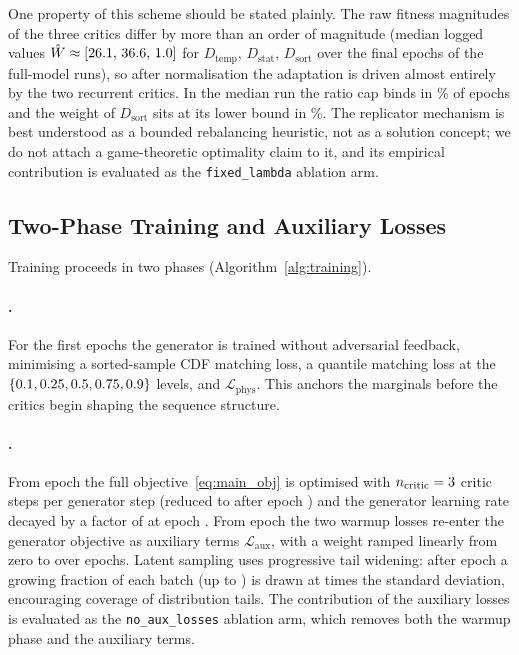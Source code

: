 \documentclass[preprint,12pt]{elsarticle}
\makeatletter
\let\ElsParagraph\paragraph
\def\StripRunInStop#1.\StripRunInMark#2\StripRunInEnd{#1}
\let\StripRunInMark\@empty
\renewcommand\paragraph[1]{\ElsParagraph{\StripRunInStop#1\StripRunInMark.\StripRunInMark\StripRunInEnd}}
\newcommand{\Lc}{\mathcal{L}}
\newcommand{\Dtemp}{D_{\mathrm{temp}}}
\newcommand{\Dstat}{D_{\mathrm{stat}}}
\newcommand{\Dsort}{D_{\mathrm{sort}}}
\makeatother
\begin{document}
One property of this scheme should be stated plainly.  The raw fitness
magnitudes of the three critics differ by more than an order of
magnitude (median logged values
$\hat{W} \approx [26.1,\, 36.6,\, 1.0]$ for
$\Dtemp$, $\Dstat$, $\Dsort$ over the final \phFitLastEpochs{} epochs of
the \phNRunsLambda{} full-model runs), so after normalisation the
adaptation is driven almost entirely by the two recurrent critics.  In
the median run the ratio cap binds in \phRatioCapBindsPct\% of epochs and
the weight of $\Dsort$ sits at its lower bound in
\phLambdaSortAtFloorPct\%.  The replicator mechanism is best understood
as a bounded rebalancing heuristic, not as a solution concept; we do not
attach a game-theoretic optimality claim to it, and its empirical
contribution is evaluated as the \texttt{fixed\_lambda} ablation arm.

\subsection{Two-Phase Training and Auxiliary Losses}
\label{sec:training}

Training proceeds in two phases (Algorithm~\ref{alg:training}).

\paragraph{Phase 1: Distributional warmup.}
For the first \protoWarmup{} epochs the generator is trained without adversarial
feedback, minimising a sorted-sample CDF matching loss, a quantile
matching loss at the $\{0.1, 0.25, 0.5, 0.75, 0.9\}$ levels, and
$\Lc_{\mathrm{phys}}$.  This anchors the marginals before the critics
begin shaping the sequence structure.

\paragraph{Phase 2: Adversarial training.}
From epoch \protoWarmup{} the full objective~\eqref{eq:main_obj} is
optimised with $n_{\mathrm{critic}} = 3$ critic steps per
generator step (reduced to \codeNCriticLate{} after epoch \codeNCriticEp)
and the generator learning rate decayed by a factor of \codeLrDecayDiv{}
at epoch \codeLrDecayEp.  From epoch \codeAuxStart{} the two warmup
losses re-enter the generator objective as auxiliary terms
$\Lc_{\mathrm{aux}}$, with a weight ramped linearly from zero to
\codeAuxW{} over \codeAuxRamp{} epochs.  Latent sampling uses progressive
tail widening: after epoch \codeTailStart{} a growing fraction of each
batch (up to \codeTailFracMax) is drawn at \codeTailScale{} times the
standard deviation,
encouraging coverage of distribution tails.  The contribution of the auxiliary losses is evaluated as the
\texttt{no\_aux\_losses} ablation arm, which removes both the warmup
phase and the auxiliary terms.
\end{document}
